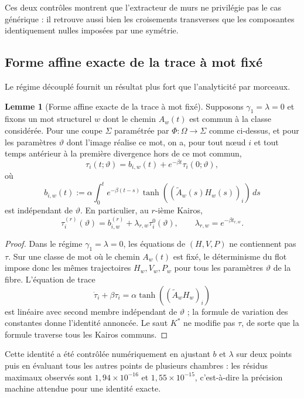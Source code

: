 \documentclass[11pt,a4paper]{article}
\theoremstyle{definition}
\newtheorem{lemma}[definition]{Lemme}
\theoremstyle{remark}
\begin{document}
Ces deux contrôles montrent que l'extracteur de murs ne privilégie pas le cas générique : il retrouve aussi bien les croisements transverses que les composantes identiquement nulles imposées par une symétrie.

\subsection{Forme affine exacte de la trace à mot fixé}

Le régime découplé fournit un résultat plus fort que l'analyticité par morceaux.

\begin{lemma}[Forme affine exacte de la trace à mot fixé]
\label{lem:trace-affine-chambre}
Supposons $\gamma_1=\lambda=0$ et fixons un mot structurel $w$ dont le chemin $A_w(t)$ est commun à la classe considérée. Pour une coupe $\Sigma$ paramétrée par $\Phi:\Omega\to\Sigma$ comme ci-dessus, et pour les paramètres $\vartheta$ dont l'image réalise ce mot, on a, pour tout nœud $i$ et tout temps antérieur à la première divergence hors de ce mot commun,
\[
 \boxed{
 \tau_i(t;\vartheta)
 =b_{i,w}(t)+e^{-\beta t}\tau_i(0;\vartheta),}
\]
où
\[
 b_{i,w}(t)
 :=\alpha\int_0^t e^{-\beta(t-s)}
 \tanh\!\left((\widetilde A_w(s)H_w(s))_i\right)\,ds
\]
est indépendant de $\vartheta$. En particulier, au $r$-ième Kairos,
\[
 \tau_i^{(r)}(\vartheta)
 =b_{i,w}^{(r)}+\lambda_{r,w}\tau_i^0(\vartheta),
 \qquad
 \lambda_{r,w}=e^{-\beta t_{r,w}}.
\]
\end{lemma}

\begin{proof}
Dans le régime $\gamma_1=\lambda=0$, les équations de $(H,V,P)$ ne contiennent pas $\tau$. Sur une classe de mot où le chemin $A_w(t)$ est fixé, le déterminisme du flot impose donc les mêmes trajectoires $H_w,V_w,P_w$ pour tous les paramètres $\vartheta$ de la fibre. L'équation de trace
\[
 \dot\tau_i+\beta\tau_i
 =\alpha\tanh\!\left((\widetilde A_w H_w)_i\right)
\]
est linéaire avec second membre indépendant de $\vartheta$ ; la formule de variation des constantes donne l'identité annoncée. Le saut $K^*$ ne modifie pas $\tau$, de sorte que la formule traverse tous les Kairos communs.
\end{proof}

Cette identité a été contrôlée numériquement en ajustant $b$ et $\lambda$ sur deux points puis en évaluant tous les autres points de plusieurs chambres : les résidus maximaux observés sont $1{,}94\times10^{-16}$ et $1{,}55\times10^{-15}$, c'est-à-dire la précision machine attendue pour une identité exacte.
\end{document}
